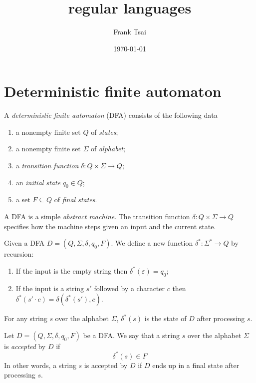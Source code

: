 \documentclass{zett}
\title{regular languages}
\author{Frank Tsai}
\date{\today}
\begin{document}
\maketitle
\tableofcontents

\section{Deterministic finite automaton}
\label{sec:dfa}

\begin{defn}
  A \emph{deterministic finite automaton} (DFA) consists of the following data
  \begin{enumerate}
  \item a nonempty finite set $Q$ of \emph{states};
  \item a nonempty finite set $\Sigma$ of \emph{alphabet};
  \item a \emph{transition function} $\delta : Q \times \Sigma \to Q$;
  \item an \emph{initial state} $q_{0} \in Q$;
  \item a set $F \subseteq Q$ of \emph{final states}.
  \end{enumerate}
\end{defn}

\begin{node}%
  A DFA is a simple \emph{abstract machine}.
  The transition function $\delta : Q \times \Sigma \to Q$ specifies how the machine steps given an input and the current state.
\end{node}

\begin{node}%
  Given a DFA $D = (Q, \Sigma, \delta, q_{0}, F)$.
  We define a new function $\delta^{*} : \Sigma^{*} \to Q$ by recursion:
  \begin{enumerate}
  \item If the input is the empty string then $\delta^{*}(\varepsilon) = q_{0}$;
  \item If the input is a string $s'$ followed by a character $c$ then $\delta^{*}(s' \cdot c) = \delta(\delta^{*}(s'), c)$.
  \end{enumerate}
  For any string $s$ over the alphabet $\Sigma$, $\delta^{*}(s)$ is the state of $D$ after processing $s$.
\end{node}

\begin{defn}
  Let $D = (Q, \Sigma, \delta, q_{0}, F)$ be a DFA.
  We say that a string $s$ over the alphabet $\Sigma$ is \emph{accepted} by $D$ if
  $$
  \delta^{*}(s) \in F
  $$
  In other words, a string $s$ is accepted by $D$ if $D$ ends up in a final state after processing $s$.
\end{defn}
\end{document}
